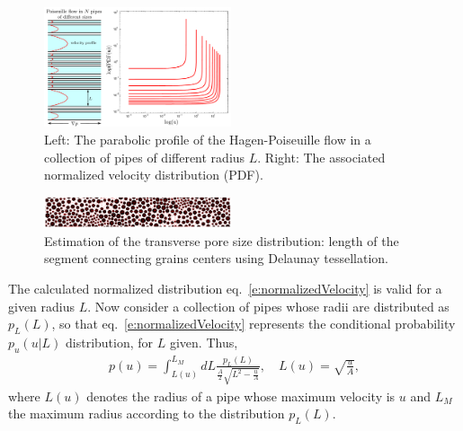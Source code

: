 \documentclass[onecolumn,showpacs,pre,preprintnumbers,floatfix]{revtex4-1}
\begin{document}
%
\begin{figure}[h!]
  \begin{center}
  \includegraphics[width=0.49\textwidth]{./images/pipe_scheme.pdf}
  \caption{Left: The parabolic profile of the Hagen-Poiseuille flow in a
  collection of pipes of different radius $L$. Right: The associated
  normalized velocity distribution (PDF).}\label{f:HPflowCollection}
  \end{center}
\end{figure}%
%
%
\begin{figure}[h!]
  \begin{center}
  \includegraphics[width=0.49\textwidth]{./images/pore_Delaunay.pdf}
  \caption{Estimation of the transverse pore size
  distribution: length of the segment connecting grains centers using
  Delaunay tessellation.}\label{f:geometryDelaunay}
  \end{center}
\end{figure}
%
The calculated normalized distribution eq.~\eqref{e:normalizedVelocity}
is valid for a given radius $L$.  Now consider a collection of pipes
whose radii are distributed as $p_L(L)$, so that
eq.~\eqref{e:normalizedVelocity} represents the conditional probability
$p_u(u|L)$ distribution, for $L$ given. Thus,
%
\begin{align}
  p(u) = \int_{L(u)}^{L_M} dL \frac{p_L(L)}{\frac{A}{2} 
    \sqrt{L^2 - \frac{u}{A}}}, \quad L(u) = \sqrt{\frac{u}{A}},
  \label{e:collectiveVelocity}
\end{align}
%
where $L(u)$ denotes the radius of a pipe whose maximum velocity is $u$ and $L_M$ the maximum radius according to the distribution $p_L(L)$.\\
\end{document}

